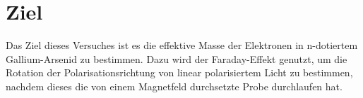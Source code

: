 \section{Ziel}
\label{sec:Ziel}

Das Ziel dieses Versuches ist es die effektive Masse der Elektronen in n-dotiertem Gallium-Arsenid zu bestimmen. Dazu wird der Faraday-Effekt 
genutzt, um die Rotation der Polarisationsrichtung von linear polarisiertem Licht zu bestimmen, nachdem dieses die von einem Magnetfeld durchsetzte 
Probe durchlaufen hat.